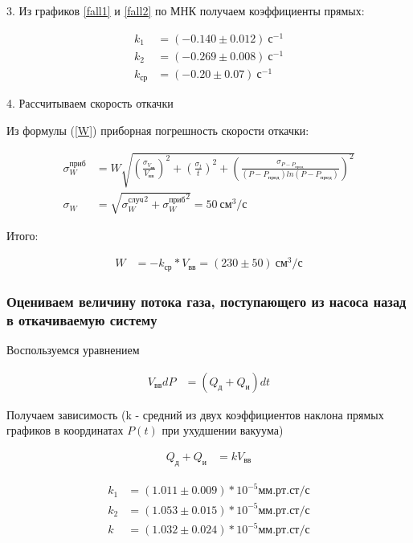 \documentclass[a4paper, 12pt]{article}
\begin{document}
            3. Из графиков \ref{fall1} и \ref{fall2} по МНК получаем коэффициенты прямых:

            \begin{align*}
                k_1 &= (-0.140 \pm 0.012)~с^{-1}\\
                k_2 &= (-0.269 \pm 0.008)~с^{-1}\\
                k_{ср} &= (-0.20 \pm 0.07)~с^{-1}
            \end{align*}

            4. Рассчитываем скорость откачки

            Из формулы (\ref{W}) приборная погрешность скорости откачки:

            \begin{align*}
                \sigma_W^{приб} &= W \sqrt{\left( \frac{\sigma_{V_{вв}}}{V_{вв}} \right)^2 + \left( \frac{\sigma_{t}}{t} \right)^2 + \left( \frac{\sigma_{P - P_{пред}}}{(P - P_{пред}) ln(P - P_{пред})} \right)^2}\\
                \sigma_W &= \sqrt{{\sigma_W^{случ}}^2 + {\sigma_W^{приб}}^2} = 50~см^3/с
            \end{align*}

            Итого:

            \begin{align*}
                W &= -k_{ср} * V_{вв} = (230 \pm 50)~см^3/с
            \end{align*}

        \subsubsection{Оцениваем величину потока газа, поступающего из насоса назад в откачиваемую систему}

            Воспользуемся уравнением

            \begin{align*}
                V_{вв} dP &= (Q_д + Q_и)dt
            \end{align*}

            Получаем зависимость (k - средний из двух коэффициентов наклона прямых графиков в координатах $P(t)$ при ухудшении вакуума)

            \begin{align*}
                Q_д + Q_и &= k V_{вв}
            \end{align*}

            \begin{align*}
                k_1 &= (1.011 \pm 0.009) * 10^{-5} мм.рт.ст/с\\
                k_2 &= (1.053 \pm 0.015) * 10^{-5} мм.рт.ст/с\\
                k &= (1.032 \pm 0.024) * 10^{-5} мм.рт.ст/с
            \end{align*}
\end{document}
